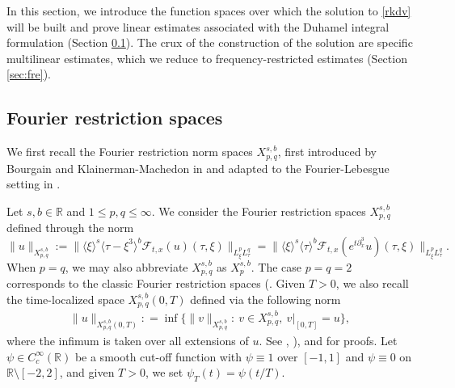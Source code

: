 \documentclass[%
11pt,  reqno]{amsart}
\newcommand{\jap}[1]{\langle #1 \rangle}
\newcommand{\5}{\textup{V}}
\newcommand{\F}{\mathcal{F}}
\newcommand{\dx}{\partial_x}
\theoremstyle{remark}
\newcommand{\R}{\mathbb{R}}
\newcommand{\jb}[1]
{\langle #1 \rangle}
\numberwithin{equation}{section}
\numberwithin{theorem}{section}
\begin{document}
	In this section, we introduce the function spaces over which the solution to \eqref{rkdv} will be built and prove linear estimates associated with the Duhamel integral formulation (Section \ref{sec:fourier_restr}). The crux of the  construction of the solution are specific multilinear estimates, which we reduce to  frequency-restricted estimates (Section \ref{sec:fre}).
	
	
	\subsection{Fourier restriction spaces}\label{sec:fourier_restr}
	
	We first recall the Fourier restriction norm spaces $X^{s,b}_{p,q}$, first introduced by Bourgain \cite{bourg1, bourg2} and Klainerman-Machedon in \cite{KlainermanMachedon} and adapted to the Fourier-Lebesgue setting in \cite{Grunrock_mkdv, HerrGrunrock_FL}.
	
		
		
		Let $s,b\in \R$ and $1\le p,q \le \infty$. We consider the Fourier restriction spaces $X^{s,b}_{p,q}$ defined through the norm
		\begin{equation}\label{Xsb}
			\| u \|_{X^{s,b}_{p,q}} := \| \jap{\xi}^s \jap{\tau-\xi^3}^b \F_{t,x}(u) (\tau, \xi) \|_{L^p_\xi L^q_\tau}
            =
            \| \jb{\xi}^s \jb{\tau}^b \F_{t,x}(e^{t \dx^3} u ) (\tau, \xi) \|_{L^p_\xi L^q_\tau}. 
		\end{equation}
When $p=q$, we may also abbreviate $X^{s,b}_{p,q}$ as $X^{s,b}_p$. 
		The case $p=q=2$ corresponds to the classic Fourier restriction spaces (\cite{bourg1, bourg2}. 
        Given $T>0$, we also recall the time-localized space $X^{s, b}_{p,q} (0,T)$ defined via the following norm
        \begin{align}
            \| u\|_{X^{s, b}_{p,q}(0,T)} : = \inf 
            \big\{ 
            \| v\|_{X^{s, b}_{p,q}} : \ v\in X^{s,b}_{p,q}, \ v\vert_{[0,T]} = u 
            \big\}, 
        \end{align}
        where the infimum is taken over all extensions of $u$. See \cite[Chapter 2.6]{tao_book}, \cite[Chapter 7.4]{linares_ponce_book}), and  \cite{HerrGrunrock_FL} for proofs. 
        Let  $\psi\in C_c^\infty(\R)$ be a smooth cut-off function with $\psi\equiv 1$ over $[-1,1]$ and $\psi\equiv 0$ on $\R\setminus [-2,2]$, and given $T>0$, we set $\psi_T(t)=\psi(t/T)$.
        
\end{document}
